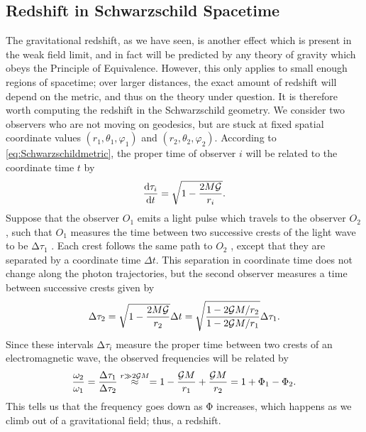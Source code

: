 		\subsection{Redshift in Schwarzschild Spacetime}
		The gravitational redshift, as we have seen, is another effect which is present in the weak
		field limit, and in fact will be predicted by any theory of gravity which obeys the Principle
		of Equivalence. However, this only applies to small enough regions of spacetime; over larger
		distances, the exact amount of redshift will depend on the metric, and thus on the theory
		under question. It is therefore worth computing the redshift in the Schwarzschild geometry.
		We consider two observers who are not moving on geodesics, but are stuck at fixed spatial
		coordinate values $(r_1 , θ_1 , φ_1 )$ and $(r_2 , θ_2 , φ_2 )$. According to \ref{eq:Schwarzschildmetric}, the proper time of observer
		$i$ will be related to the coordinate time $t$ by
		\begin{equation}
		\frac{\mathrm{d} \tau_i}{\mathrm{d} t} = \sqrt{1-\frac{2 M \mathcal{G}}{r_i}}.
		\end{equation}
		Suppose that the observer $O_1$ emits a light pulse which travels to the observer $O_2$ , such that
		$O_1$ measures the time between two successive crests of the light wave to be $∆τ_1$ . Each crest
		follows the same path to $O_2$ , except that they are separated by a coordinate time $\Delta t$.
		This separation in coordinate time does not change along the photon trajectories, but the
		second observer measures a time between successive crests given by
		\begin{equation}
		\Delta \tau_2 = \sqrt{1-\frac{2 M \mathcal{G}}{r_2}} \Delta t = \sqrt{\frac{1-2 \mathcal{G} M/r_2}{1-2 \mathcal{G} M/r_1}} \Delta \tau_1.
		\end{equation}
		Since these intervals $∆τ_i$ measure the proper time between two crests of an electromagnetic
		wave, the observed frequencies will be related by
		\begin{equation}
		\label{eq:redshiftSchwarzschild}
		\frac{\omega_2}{\omega_1} = \frac{\Delta \tau_1}{\Delta \tau_2} \stackrel{r \gg 2 \mathcal{G} M}{\approx} =1 -\frac{\mathcal{G} M}{r_1} + \frac{\mathcal{G} M}{r_2} = 1+\Phi_1 -\Phi_2.
		\end{equation}
		This tells us that the frequency goes down as Φ increases, which happens as we climb out
		of a gravitational field; thus, a redshift.
		
		
		
		
		
		
		
